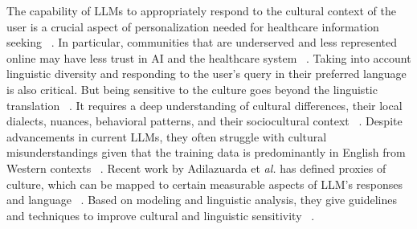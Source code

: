 The capability of LLMs to appropriately respond to the cultural context of the user is a crucial aspect of personalization needed for healthcare information seeking ~\cite{adilazuarda2024measuringmodelingculturellms, 10.1007/978-3-030-60114-0_10, Ożegalska-Łukasik_Łukasik_2023}. In particular, communities that are underserved and less represented online may have less trust in AI and the healthcare system ~\cite{harrington2023trust, kimblack2022, tsengunder}. Taking into account linguistic diversity and responding to the user’s query in their preferred language is also critical. But being sensitive to the culture goes beyond the linguistic translation ~\cite{orosoo2024enhancing, heim2013}. It requires a deep understanding of cultural differences, their local dialects, nuances, behavioral patterns, and their sociocultural context ~\cite{10.1007/978-3-030-60114-0_10}. Despite advancements in current LLMs, they often struggle with cultural misunderstandings given that the training data is predominantly in English from Western contexts ~\cite{tsengunder, 10.1145/1878450.1878481, griffith2024cultural}. Recent work by Adilazuarda et \textit{al.} has defined proxies of culture, which can be mapped to certain measurable aspects of LLM’s responses and language ~\cite{adilazuarda2024measuringmodelingculturellms}. Based on modeling and linguistic analysis, they give guidelines and techniques to improve cultural and linguistic sensitivity ~\cite{griffith2024cultural, 10.1007/978-3-030-60114-0_10, article}. 




